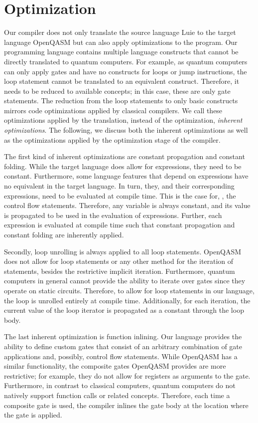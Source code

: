\section{Optimization}
\label{sec:concept_optimization}
Our compiler does not only translate the source language Luie to the target language OpenQASM but can also apply optimizations to the program.
Our programming language contains multiple language constructs that cannot be directly translated to quantum computers. For example, as quantum computers can only apply gates and have no constructs for loops or jump instructions, the loop statement cannot be translated to an equivalent construct. Therefore, it needs to be reduced to available concepts; in this case, these are only gate statements. The reduction from the loop statements to only basic constructs mirrors code optimizations applied by classical compilers. We call these optimizations applied by the translation, instead of the optimization, \emph{inherent optimizations}.
The following, we discuss both the inherent optimizations as well as the optimizations applied by the optimization stage of the compiler.

The first kind of inherent optimizations are constant propagation and constant folding. 
While the target language does allow for expressions, they need to be constant. Furthermore, some language features that depend on expressions have no equivalent in the target language. In turn, they, and their corresponding expressions, need to be evaluated at compile time. This is the case for, \eg, the control flow statements. Therefore, any variable is always constant, and its value is propagated to be used in the evaluation of expressions. Further, each expression is evaluated at compile time such that constant propagation and constant folding are inherently applied.

Secondly, loop unrolling is always applied to all loop statements. OpenQASM does not allow for loop statements or any other method for the iteration of statements, besides the restrictive implicit iteration. Furthermore, quantum computers in general cannot provide the ability to iterate over gates since they operate on static circuits. Therefore, to allow for loop statements in our language, the loop is unrolled entirely at compile time. Additionally, for each iteration, the current value of the loop iterator is propagated as a constant through the loop body.

The last inherent optimization is function inlining. Our language provides the ability to define custom gates that consist of an arbitrary combination of gate applications and, possibly, control flow statements. While OpenQASM has a similar functionality, the composite gates OpenQASM provides are more restrictive; for example, they do not allow for registers as arguments to the gate. Furthermore, in contrast to classical computers, quantum computers do not natively support function calls or related concepts. Therefore, each time a composite gate is used, the compiler inlines the gate body at the location where the gate is applied.

